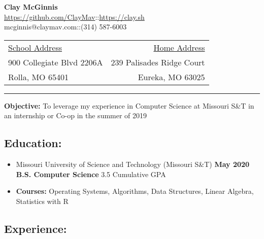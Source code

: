 \documentclass[9pt,oneside]{memoir}
\makeatletter
\newcommand{\name}{Clay McGinnis}
\newcommand{\phone}{(314) 587-6003}
\newcommand{\email}{mcginnis@claymav.com}
\newcommand{\github}{https://github.com/ClayMav}
\newcommand{\website}{https://clay.sh}
\newcommand{\cgpa}{3.5}
\makeatother
\begin{document}
 \selectfont

\begin{center}
  \textbf{\huge{\name}}\\
    \url{\github}\hspace*{10px}::\hspace*{10px}\url{\website}\\
    \email\hspace*{10px}::\hspace*{10px}\phone\\
\end{center}

\begin{tabular*}{\textwidth}{@{\extracolsep{\fill} } l r}
\underline{School Address} & \underline{Home Address}\\
900 Collegiate Blvd 2206A & 239 Palisades Ridge Court\\
Rolla, MO 65401 & Eureka, MO 63025\\
\end{tabular*}

\vspace{3pt} \rule{\textwidth}{1pt}\vspace{6pt}

\textbf{Objective:} To leverage my experience in Computer Science at Missouri S\&T in an internship or Co-op in the summer of 2019

\subsection*{Education:}

\begin{itemize}
  \item[] Missouri University of Science and Technology (Missouri S\&T)
    \hfill \textbf{May 2020}\\
        \textbf{B.S. Computer Science}
    \hfill \cgpa{} Cumulative GPA
  \item[] \textbf{Courses:} Operating Systems, Algorithms, Data Structures, Linear Algebra, Statistics with R
\end{itemize}

\subsection*{Experience:}
\end{document}
